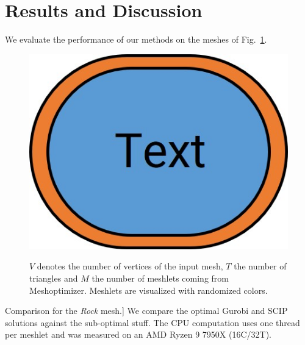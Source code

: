 \section{Results and Discussion}\label{Sec:Evaluation}

We evaluate the performance of our methods on the meshes of Fig.~\ref{fig:meshes}.
    
\begin{figure}
\end{figure}

\begin{figure}
    \includegraphics[width=\columnwidth]{imgs/Sketch.jpg}%
\end{figure}


\begin{figure}
    \centering%
    \def\svgwidth{\textwidth}%
    \fontsize{6pt}{5pt}\selectfont%
    \caption[Test Meshes]{
    $V$ denotes the number of vertices of the input mesh, $T$ the number of triangles and $M$ the number of meshlets coming from Meshoptimizer.
    Meshlets are visualized with randomized colors.
    }\label{fig:meshes}%
\end{figure}%

\begin{table}
    \caption
    [Comparison for the \textit{Rock} mesh.]
    {    
    We compare the optimal Gurobi and SCIP solutions against the sub-optimal stuff.
    The CPU computation uses one thread per meshlet and was measured on an AMD Ryzen 9 7950X (16C/32T).    
    }\label{tab:StripifyTable}    
    {
    \centering    
    
    }
\end{table}


